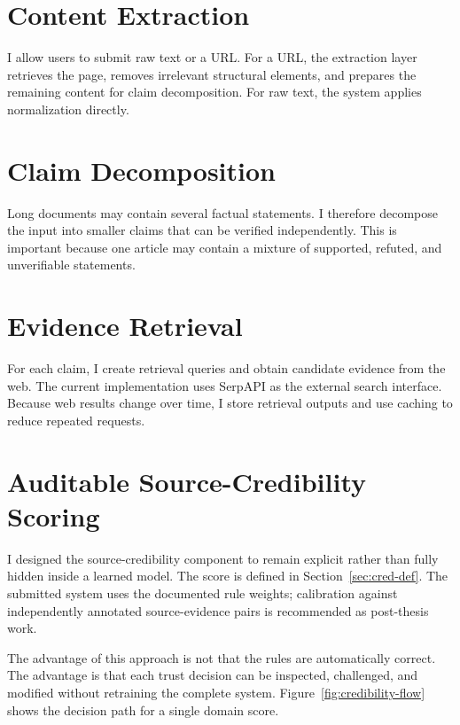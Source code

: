 \documentclass[12pt,a4paper,openany]{report}
\begin{document}
\section{Content Extraction}
I allow users to submit raw text or a URL. For a URL, the extraction layer retrieves the page, removes irrelevant structural elements, and prepares the remaining content for claim decomposition. For raw text, the system applies normalization directly.

\section{Claim Decomposition}
Long documents may contain several factual statements. I therefore decompose the input into smaller claims that can be verified independently. This is important because one article may contain a mixture of supported, refuted, and unverifiable statements.

\section{Evidence Retrieval}
For each claim, I create retrieval queries and obtain candidate evidence from the web. The current implementation uses SerpAPI as the external search interface. Because web results change over time, I store retrieval outputs and use caching to reduce repeated requests.

\section{Auditable Source-Credibility Scoring}
I designed the source-credibility component to remain explicit rather than fully hidden inside a learned model. The score is defined in Section~\ref{sec:cred-def}. The submitted system uses the documented rule weights; calibration against independently annotated source-evidence pairs is recommended as post-thesis work.

The advantage of this approach is not that the rules are automatically correct. The advantage is that each trust decision can be inspected, challenged, and modified without retraining the complete system. Figure~\ref{fig:credibility-flow} shows the decision path for a single domain score.
\end{document}
